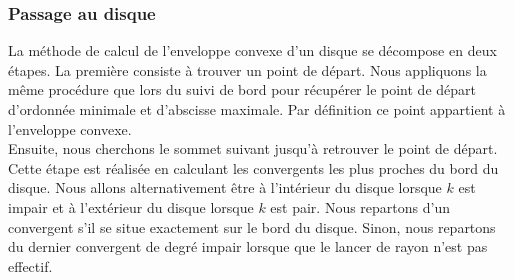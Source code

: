 


\subsubsection{Passage au disque}


La méthode de calcul de l'enveloppe convexe d'un disque se décompose en deux étapes. La première consiste à trouver un point de départ. Nous appliquons la même procédure que lors du suivi de bord pour récupérer le point de départ d'ordonnée minimale et d'abscisse maximale. Par définition ce point appartient à l'enveloppe convexe.\\

Ensuite, nous cherchons le sommet suivant jusqu'à retrouver le point de départ. Cette étape est réalisée en calculant les convergents les plus proches du bord du disque. Nous allons alternativement être à l'intérieur du disque lorsque $k$ est impair et à l'extérieur du disque lorsque $k$ est pair. Nous repartons d'un convergent s'il se situe exactement sur le bord du disque. Sinon, nous repartons du dernier convergent de degré impair lorsque que le lancer de rayon n'est pas effectif.\\

